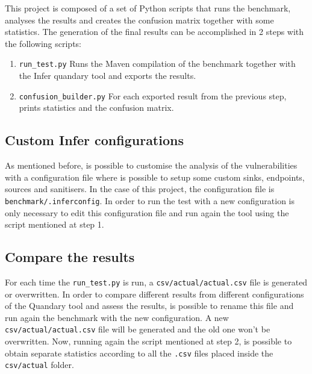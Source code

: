 \documentclass[../Report.tex]{subfiles}
\begin{document}
This project is composed of a set of Python scripts that runs the benchmark, analyses the results and creates the confusion matrix together with some statistics. 
The generation of the final results can be accomplished in 2 steps with the following scripts:

\begin{enumerate}
	\item \texttt{run\_test.py} Runs the Maven compilation of the benchmark together with the Infer quandary tool and exports the results. 
	\item \texttt{confusion\_builder.py} For each exported result from the previous step, prints statistics and the confusion matrix.
\end{enumerate}

\subsection{Custom Infer configurations}
As mentioned before, is possible to customise the analysis of the vulnerabilities with a configuration file where is possible to setup some custom sinks, endpoints, sources and sanitisers. In the case of this project, the configuration file is \texttt{benchmark/.inferconfig}.
In order to run the test with a new configuration is only necessary to edit this configuration file and run again the tool using the script mentioned at step 1.

\subsection{Compare the results}
For each time the \texttt{run\_test.py} is run, a \texttt{csv/actual/actual.csv} file is generated or overwritten. In order to compare different results from different configurations of the Quandary tool and assess the results, is possible to rename this file and run again the benchmark with the new configuration. A new \texttt{csv/actual/actual.csv} file will be generated and the old one won't be overwritten. Now, running again the script mentioned at step 2, is possible to obtain separate statistics according to all the \texttt{.csv} files placed inside the \texttt{csv/actual} folder. 
\end{document}

